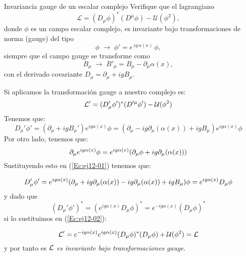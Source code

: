 \begin{Ejercicio}{Invariancia gauge de un escalar complejo}\label{Ej:18}
Verifique que el lagrangiano
\[
\mathcal{L}=(D_\mu\phi)^\ast(D^\mu\phi)-\mathcal{U}(\phi^2),
\]
donde $\phi$ es un campo escalar complejo, es invariante bajo transformaciones de norma (gauge) del tipo
\[
\phi \;\to\; \phi' = e^{\,i g\,\alpha(x)}\,\phi,
\]
siempre que el campo gauge se transforme como
\[
B_\mu \;\to\; B'_\mu = B_\mu - \partial_\mu \alpha(x),
\]
con el derivado covariante $D_\mu=\partial_\mu + i g B_\mu$.
\end{Ejercicio}
Si aplicamos la transformación gauge a nuestro complejo es: 
\begin{equation}
	\mathcal{L}' = (D'_\mu \phi')^* (D^{\prime \mu} \phi') - \mathcal{U} (\phi^2) \label{Ec:ej12-02}
\end{equation}
Tenemos que: 
\begin{equation}
	D_\mu' \phi' = (\partial_\mu + i g  B_\mu') e^{ig\alpha(x)} \phi =  (\partial_\mu - ig\partial_\mu(\alpha(x))+ i g  B_\mu) e^{ig\alpha(x)} \phi \label{Ec:ej12-01}
\end{equation}
Por otro lado, tenemos que:
\begin{equation}
	\partial_\mu e^{ig\alpha(x)} \phi = e^{ig\alpha(x)} \pqty{\partial_\mu\phi + ig \partial_\mu(\alpha(x))}
\end{equation}
Sustituyendo esto en (\ref{Ec:ej12-01}) tenemos que: 

\begin{equation}
	D_\mu' \phi' =e^{ig\alpha(x)}  \pqty{\partial_\mu + ig\partial_\mu(\alpha(x)) - ig\partial_\mu(\alpha(x)) + i gB_\mu  } \phi = e^{ig\alpha(x)} D_\mu \phi
\end{equation}
y dado que
\begin{equation}
	(D_\mu' \phi')^* = (e^{ig\alpha(x)}D_\mu \phi)^* = e^{-ig\alpha(x)} (D_\mu \phi)^*
\end{equation}
si lo sustituimos en (\ref{Ec:ej12-02}): 

\begin{equation}
	\mathcal{L}' = e^{-ig\alpha(x)} e^{ig\alpha(x)} (D_\mu\phi)^*(D_\mu \phi) + \mathcal{U}(\phi^2)= \mathcal{L} 
\end{equation}
y por tanto es  $\mathcal{L}$ \textit{es invariante bajo transformaciones gauge}.

